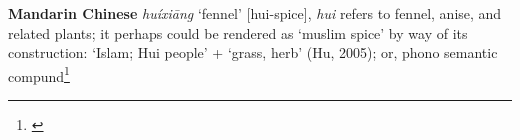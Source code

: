 \begin{etymology}\label{ety:huixiang}
\textbf{Mandarin Chinese}  \textit{huíxiāng} `fennel' [hui-spice],  \textit{hui} refers to fennel, anise, and related plants; it perhaps could be rendered as `muslim spice' by way of its construction:  `Islam; Hui people' +  `grass, herb' (Hu, 2005); or, phono semantic compund\footnote{\textcite{hu_food_2005}}
\end{etymology}